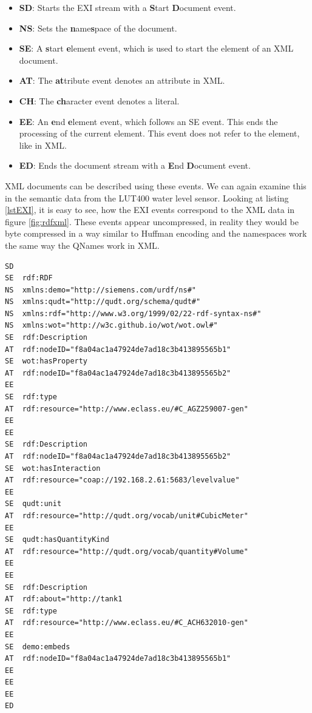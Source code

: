 \begin{itemize}

\item \textbf{SD}: Starts the EXI stream with a \textbf{S}tart \textbf{D}ocument event.
\item \textbf{NS}: Sets the \textbf{n}ame\textbf{s}pace of the document.
\item \textbf{SE}: A \textbf{s}tart \textbf{e}lement event, which is used to start the element of an XML document.
\item \textbf{AT}: The \textbf{at}tribute event denotes an attribute in XML.
\item \textbf{CH}: The \textbf{ch}aracter event denotes a literal.
\item \textbf{EE}: An \textbf{e}nd \textbf{e}lement event, which follows an SE event. This ends the processing of the current element. This event does not refer to the element, like in XML.
\item \textbf{ED}: Ends the document stream with a \textbf{E}nd \textbf{D}ocument event.
\end{itemize}

XML documents can be described using these events. We can again examine this in the semantic data from the LUT400 water level sensor. Looking at listing \ref{lstEXI}, it is easy to see, how the EXI events correspond to the XML data in figure \ref{fig:rdfxml}. These events appear uncompressed, in reality they would be byte compressed in a way similar to Huffman encoding and the namespaces work the same way the QNames work in XML\cite{.02.10.2017b}.



\begin{lstlisting}[caption={The LUT400's XML data as serialized in EXI events.},captionpos=b, label={lstEXI}]
SD
SE	rdf:RDF
NS	xmlns:demo="http://siemens.com/urdf/ns#"
NS	xmlns:qudt="http://qudt.org/schema/qudt#"
NS	xmlns:rdf="http://www.w3.org/1999/02/22-rdf-syntax-ns#"
NS	xmlns:wot="http://w3c.github.io/wot/wot.owl#"
SE	rdf:Description
AT	rdf:nodeID="f8a04ac1a47924de7ad18c3b413895565b1"
SE	wot:hasProperty
AT	rdf:nodeID="f8a04ac1a47924de7ad18c3b413895565b2"
EE
SE	rdf:type
AT	rdf:resource="http://www.eclass.eu/#C_AGZ259007-gen"
EE
EE
SE	rdf:Description
AT	rdf:nodeID="f8a04ac1a47924de7ad18c3b413895565b2"
SE	wot:hasInteraction
AT	rdf:resource="coap://192.168.2.61:5683/levelvalue"
EE
SE	qudt:unit
AT	rdf:resource="http://qudt.org/vocab/unit#CubicMeter"
EE
SE	qudt:hasQuantityKind
AT	rdf:resource="http://qudt.org/vocab/quantity#Volume"
EE
EE
SE	rdf:Description
AT	rdf:about="http://tank1
SE	rdf:type
AT	rdf:resource="http://www.eclass.eu/#C_ACH632010-gen"
EE
SE	demo:embeds
AT	rdf:nodeID="f8a04ac1a47924de7ad18c3b413895565b1"
EE
EE
EE
ED
\end{lstlisting}



